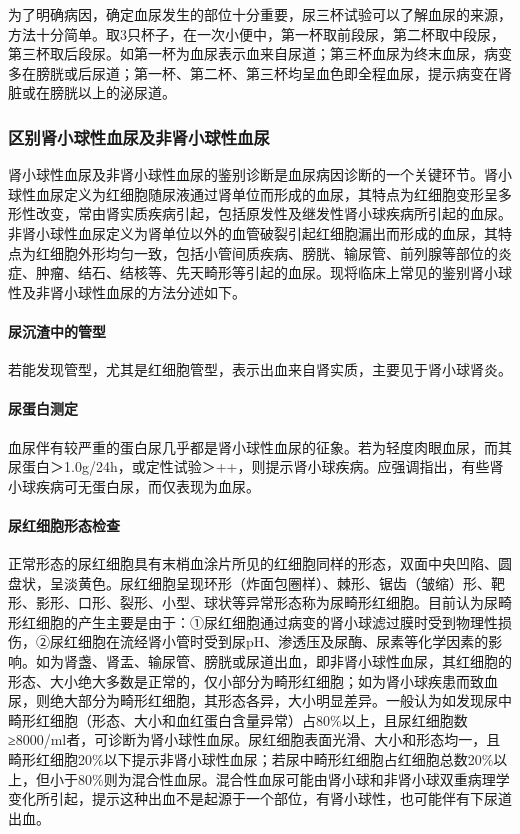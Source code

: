为了明确病因，确定血尿发生的部位十分重要，尿三杯试验可以了解血尿的来源，方法十分简单。取3只杯子，在一次小便中，第一杯取前段尿，第二杯取中段尿，第三杯取后段尿。如第一杯为血尿表示血来自尿道；第三杯血尿为终末血尿，病变多在膀胱或后尿道；第一杯、第二杯、第三杯均呈血色即全程血尿，提示病变在肾脏或在膀胱以上的泌尿道。

\subsubsection{区别肾小球性血尿及非肾小球性血尿}

肾小球性血尿及非肾小球性血尿的鉴别诊断是血尿病因诊断的一个关键环节。肾小球性血尿定义为红细胞随尿液通过肾单位而形成的血尿，其特点为红细胞变形呈多形性改变，常由肾实质疾病引起，包括原发性及继发性肾小球疾病所引起的血尿。非肾小球性血尿定义为肾单位以外的血管破裂引起红细胞漏出而形成的血尿，其特点为红细胞外形均匀一致，包括小管间质疾病、膀胱、输尿管、前列腺等部位的炎症、肿瘤、结石、结核等、先天畸形等引起的血尿。现将临床上常见的鉴别肾小球性及非肾小球性血尿的方法分述如下。

\paragraph{尿沉渣中的管型}

若能发现管型，尤其是红细胞管型，表示出血来自肾实质，主要见于肾小球肾炎。

\paragraph{尿蛋白测定}

血尿伴有较严重的蛋白尿几乎都是肾小球性血尿的征象。若为轻度肉眼血尿，而其尿蛋白＞1.0g/24h，或定性试验＞++，则提示肾小球疾病。应强调指出，有些肾小球疾病可无蛋白尿，而仅表现为血尿。

\paragraph{尿红细胞形态检查}

正常形态的尿红细胞具有末梢血涂片所见的红细胞同样的形态，双面中央凹陷、圆盘状，呈淡黄色。尿红细胞呈现环形（炸面包圈样）、棘形、锯齿（皱缩）形、靶形、影形、口形、裂形、小型、球状等异常形态称为尿畸形红细胞。目前认为尿畸形红细胞的产生主要是由于：①尿红细胞通过病变的肾小球滤过膜时受到物理性损伤，②尿红细胞在流经肾小管时受到尿pH、渗透压及尿酶、尿素等化学因素的影响。如为肾盏、肾盂、输尿管、膀胱或尿道出血，即非肾小球性血尿，其红细胞的形态、大小绝大多数是正常的，仅小部分为畸形红细胞；如为肾小球疾患而致血尿，则绝大部分为畸形红细胞，其形态各异，大小明显差异。一般认为如发现尿中畸形红细胞（形态、大小和血红蛋白含量异常）占80\%以上，且尿红细胞数≥8000/ml者，可诊断为肾小球性血尿。尿红细胞表面光滑、大小和形态均一，且畸形红细胞20\%以下提示非肾小球性血尿；若尿中畸形红细胞占红细胞总数20\%以上，但小于80\%则为混合性血尿。混合性血尿可能由肾小球和非肾小球双重病理学变化所引起，提示这种出血不是起源于一个部位，有肾小球性，也可能伴有下尿道出血。

